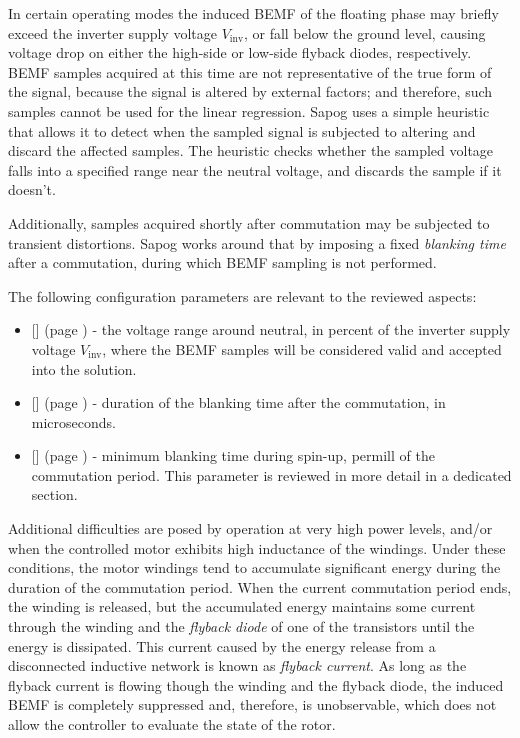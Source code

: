 \documentclass{zubaxdoc}
\newcommand{\CfgRef}[1]{
    \StrSubstitute{#1}{+}{\textunderscore}[\temp]
    \texttt{\temp} {\footnotesize (page \pageref{#1})}
}
\begin{document}
In certain operating modes the induced BEMF of the floating phase may briefly exceed the
inverter supply voltage $V_\text{inv}$, or fall below the ground level,
causing voltage drop on either the high-side or low-side flyback diodes, respectively.
BEMF samples acquired at this time are not representative of the true form of the signal,
because the signal is altered by external factors;
and therefore, such samples cannot be used for the linear regression.
Sapog uses a simple heuristic that allows it to detect when the sampled signal is subjected to
altering and discard the affected samples.
The heuristic checks whether the sampled voltage falls into a specified range near the neutral voltage,
and discards the sample if it doesn't.

Additionally, samples acquired shortly after commutation may be subjected to transient distortions.
Sapog works around that by imposing a fixed \emph{blanking time} after a commutation, during which
BEMF sampling is not performed.

The following configuration parameters are relevant to the reviewed aspects:

\begin{itemize}
\item \CfgRef{mot+bemf+range} - the voltage range around neutral,
in percent of the inverter supply voltage $V_\text{inv}$, where the BEMF samples
will be considered valid and accepted into the solution.
\item \CfgRef{mot+blank+usec} - duration of the blanking time after the commutation, in microseconds.
\item \CfgRef{mot+spup+blnk+pm} - minimum blanking time during spin-up, permill of the commutation period.
This parameter is reviewed in more detail in a dedicated section.
\end{itemize}

Additional difficulties are posed by operation at very high power levels,
and/or when the controlled motor exhibits high inductance of the windings.
Under these conditions, the motor windings tend to accumulate significant energy during the duration
of the commutation period.
When the current commutation period ends, the winding is released, but the accumulated energy maintains
some current through the winding and the \emph{flyback diode} of one of the transistors until
the energy is dissipated.
This current caused by the energy release from a disconnected inductive network is known as
\emph{flyback current}.
As long as the flyback current is flowing though the winding and the flyback diode,
the induced BEMF is completely suppressed and, therefore,
is unobservable, which does not allow the controller to evaluate the state of the rotor.
\end{document}
